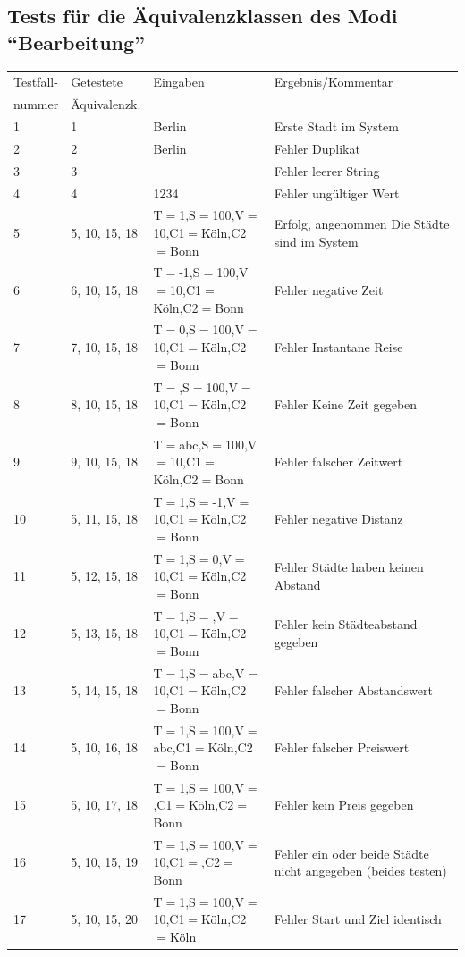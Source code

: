 \documentclass[a4paper]{report}
\begin{document}
\begin{landscape}
\subsection*{Tests für die Äquivalenzklassen des Modi ``Bearbeitung''}
\begin{tabular}{|l|l|l|l|}
\hline
Testfall- 	& Getestete 		& Eingaben 	& Ergebnis/Kommentar\\
nummer		& Äquivalenzk.		& 		&\\
\hline
1 		& 1			& Berlin	& Erste Stadt im System \\
2 		& 2			& Berlin	& Fehler Duplikat \\
3 		& 3			& \glqq\ \grqq  & Fehler leerer String\\
4 		& 4			& 1234		& Fehler ungültiger Wert \\
5 		& 5, 10, 15, 18		& T$=$1,S$=$100,V$=$10,C1$=$Köln,C2$=$Bonn & Erfolg, angenommen Die Städte sind im System\\
6 		& 6, 10, 15, 18		& T$=$-1,S$=$100,V$=$10,C1$=$Köln,C2$=$Bonn & Fehler negative Zeit\\
7 		& 7, 10, 15, 18		& T$=$0,S$=$100,V$=$10,C1$=$Köln,C2$=$Bonn & Fehler Instantane Reise\\
8 		& 8, 10, 15, 18		& T$=$,S$=$100,V$=$10,C1$=$Köln,C2$=$Bonn & Fehler Keine Zeit gegeben\\
9 		& 9, 10, 15, 18		& T$=$abc,S$=$100,V$=$10,C1$=$Köln,C2$=$Bonn & Fehler falscher Zeitwert\\
10 		& 5, 11, 15, 18		& T$=$1,S$=$-1,V$=$10,C1$=$Köln,C2$=$Bonn & Fehler negative Distanz\\
11 		& 5, 12, 15, 18		& T$=$1,S$=$0,V$=$10,C1$=$Köln,C2$=$Bonn & Fehler Städte haben keinen Abstand\\
12 		& 5, 13, 15, 18		& T$=$1,S$=$,V$=$10,C1$=$Köln,C2$=$Bonn & Fehler kein Städteabstand gegeben\\
13 		& 5, 14, 15, 18		& T$=$1,S$=$abc,V$=$10,C1$=$Köln,C2$=$Bonn & Fehler falscher Abstandswert\\
14 		& 5, 10, 16, 18		& T$=$1,S$=$100,V$=$abc,C1$=$Köln,C2$=$Bonn & Fehler falscher Preiswert\\
15 		& 5, 10, 17, 18		& T$=$1,S$=$100,V$=$,C1$=$Köln,C2$=$Bonn & Fehler kein Preis gegeben\\
16 		& 5, 10, 15, 19		& T$=$1,S$=$100,V$=$10,C1$=$,C2$=$Bonn & Fehler ein oder beide Städte nicht angegeben (beides testen)\\
17 		& 5, 10, 15, 20		& T$=$1,S$=$100,V$=$10,C1$=$Köln,C2$=$Köln & Fehler Start und Ziel identisch\\

\end{tabular}
\end{landscape}
\end{document}
